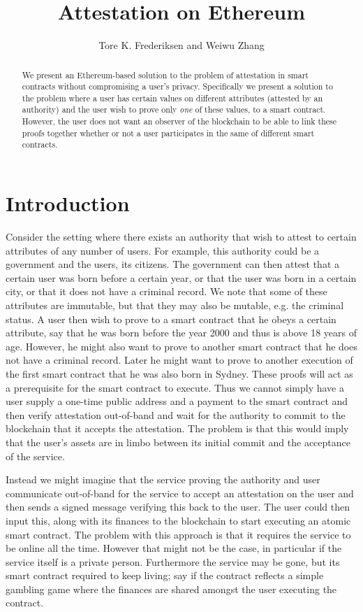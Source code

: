 \documentclass[11pt]{article} %
\author{Tore K. Frederiksen and Weiwu Zhang} \title{Attestation on Ethereum}
\begin{document}
\maketitle
\begin{abstract}
We present an Ethereum-based solution to the problem of attestation in smart contracts without compromising a user's privacy. Specifically we present a solution to the problem where a user has certain values on different attributes (attested by an authority) and the user wish to prove only \emph{one} of these values, to a smart contract. However, the user does not want an observer of the blockchain to be able to link these proofs together whether or not a user participates in the same of different smart contracts.
\end{abstract}


\section{Introduction}
Consider the setting where there exists an authority that wish to attest to certain attributes of any number of users. For example, this authority could be a government and the users, its citizens. The government can then attest that a certain user was born before a certain year, or that the user was born in a certain city, or that it does not have a criminal record. We note that some of these attributes are immutable, but that they may also be mutable, e.g. the criminal status. A user then wish to prove to a smart contract that he obeys a certain attribute, say that he was born before the year 2000 and thus is above 18 years of age. However, he might also want to prove to another smart contract that he does not have a criminal record. Later he might want to prove to another execution of the first smart contract that he was also born in Sydney. These proofs will act as a prerequisite for the smart contract to execute.
Thus we cannot simply have a user supply a one-time public address and a payment to the smart contract and then verify attestation out-of-band and wait for the authority to commit to the blockchain that it accepts the attestation. The problem is that this would imply that the user's assets are in limbo between its initial commit and the acceptance of the service. 

Instead we might imagine that the service proving the authority and user communicate out-of-band for the service to accept an attestation on the user and then sends a signed message verifying this back to the user. The user could then input this, along with its finances to the blockchain to start executing an atomic smart contract. The problem with this approach is that it requires the service to be online all the time. However that might not be the case, in particular if the service itself is a private person. Furthermore the service may be gone, but its smart contract required to keep living; say if the contract reflects a simple gambling game where the finances are shared amongst the user executing the contract.
\end{document}
